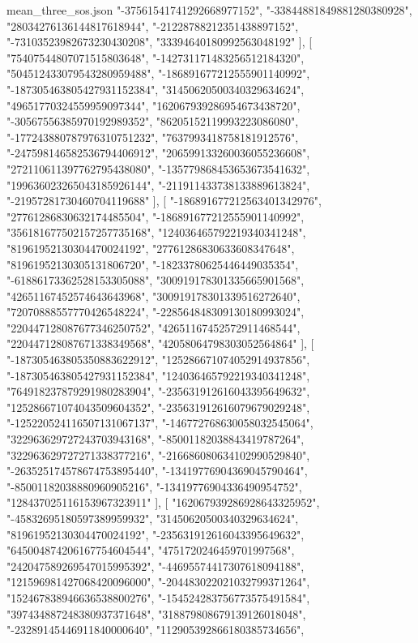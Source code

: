 \begin{filecontents*}[overwrite]{mean_three_sos.json}
    "-37561541741292668977152",
    "-33844881849881280380928",
    "28034276136144817618944",
    "-21228788212351438897152",
    "-73103523982673230430208",
    "33394640180992563048192"
   ],
   [
    "75407544807071515803648",
    "-142731171483256512184320",
    "504512433079543280959488",
    "-186891677212555901140992",
    "-187305463805427931152384",
    "31450620500340329634624",
    "49651770324559959097344",
    "162067939286954673438720",
    "-30567556385970192989352",
    "86205152119993223086080",
    "-177243880787976310751232",
    "7637993418758181912576",
    "-247598146582536794406912",
    "206599133260036055236608",
    "272110611397762795438080",
    "-135779868453653673541632",
    "199636023265043185926144",
    "-211911433738133889613824",
    "-21957281730460704119688"
   ],
   [
    "-186891677212563401342976",
    "27761286830632174485504",
    "-186891677212555901140992",
    "356181677502157257735168",
    "124036465792219340341248",
    "81961952130304470024192",
    "27761286830633608347648",
    "81961952130305131806720",
    "-18233780625446449035354",
    "-61886173362528153305088",
    "300919178301335665901568",
    "42651167452574643643968",
    "300919178301339516272640",
    "72070888557770426548224",
    "-228564848309130180993024",
    "220447128087677346250752",
    "42651167452572911468544",
    "220447128087671338349568",
    "42058064798303052564864"
   ],
   [
    "-187305463805350883622912",
    "125286671074052914937856",
    "-187305463805427931152384",
    "124036465792219340341248",
    "764918237879291980283904",
    "-235631912616043395649632",
    "125286671074043509604352",
    "-235631912616079679029248",
    "-125220524116507131067137",
    "-146772768630058032545064",
    "322963629727243703943168",
    "-85001182038843419787264",
    "322963629727271338377216",
    "-216686080634102990529840",
    "-263525174578674753895440",
    "-13419776904369045790464",
    "-85001182038880960905216",
    "-13419776904336490954752",
    "128437025116153967323911"
   ],
   [
    "162067939286928643325952",
    "-45832695180597389959932",
    "31450620500340329634624",
    "81961952130304470024192",
    "-235631912616043395649632",
    "645004874206167754604544",
    "4751720246459701997568",
    "242047589269547015995392",
    "-44695574417307618094188",
    "121596981427068420096000",
    "-204483022021032799371264",
    "152467838946636538800276",
    "-154524283756773575491584",
    "397434887248380937371648",
    "318879808679139126018048",
    "-23289145446911840000640",
    "112905392866180385734656",

\end{filecontents*}
